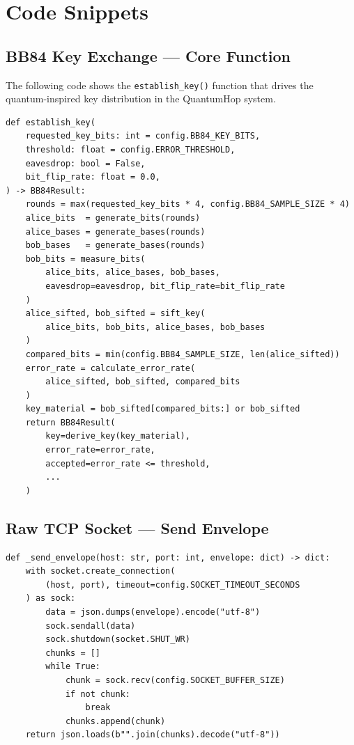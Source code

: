 \chapter{Code Snippets}

\section{BB84 Key Exchange --- Core Function}

The following code shows the \texttt{establish\_key()} function that drives the quantum-inspired key distribution in the QuantumHop system.

\begin{verbatim}
def establish_key(
    requested_key_bits: int = config.BB84_KEY_BITS,
    threshold: float = config.ERROR_THRESHOLD,
    eavesdrop: bool = False,
    bit_flip_rate: float = 0.0,
) -> BB84Result:
    rounds = max(requested_key_bits * 4, config.BB84_SAMPLE_SIZE * 4)
    alice_bits  = generate_bits(rounds)
    alice_bases = generate_bases(rounds)
    bob_bases   = generate_bases(rounds)
    bob_bits = measure_bits(
        alice_bits, alice_bases, bob_bases,
        eavesdrop=eavesdrop, bit_flip_rate=bit_flip_rate
    )
    alice_sifted, bob_sifted = sift_key(
        alice_bits, bob_bits, alice_bases, bob_bases
    )
    compared_bits = min(config.BB84_SAMPLE_SIZE, len(alice_sifted))
    error_rate = calculate_error_rate(
        alice_sifted, bob_sifted, compared_bits
    )
    key_material = bob_sifted[compared_bits:] or bob_sifted
    return BB84Result(
        key=derive_key(key_material),
        error_rate=error_rate,
        accepted=error_rate <= threshold,
        ...
    )
\end{verbatim}

\section{Raw TCP Socket --- Send Envelope}

\begin{verbatim}
def _send_envelope(host: str, port: int, envelope: dict) -> dict:
    with socket.create_connection(
        (host, port), timeout=config.SOCKET_TIMEOUT_SECONDS
    ) as sock:
        data = json.dumps(envelope).encode("utf-8")
        sock.sendall(data)
        sock.shutdown(socket.SHUT_WR)
        chunks = []
        while True:
            chunk = sock.recv(config.SOCKET_BUFFER_SIZE)
            if not chunk:
                break
            chunks.append(chunk)
    return json.loads(b"".join(chunks).decode("utf-8"))
\end{verbatim}

